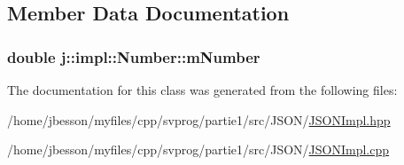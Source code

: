 \subsection{Member Data Documentation}
\hypertarget{classj_1_1impl_1_1_number_a438e3d017fd472aea2d9e3bf2108aac7}{
\subsubsection[{m\-Number}]{\setlength{\rightskip}{0pt plus 5cm}double j\-::impl\-::\-Number\-::m\-Number\hspace{0.3cm}{\ttfamily [private]}}}\label{classj_1_1impl_1_1_number_a438e3d017fd472aea2d9e3bf2108aac7}


The documentation for this class was generated from the following files\-:\begin{DoxyCompactItemize}
\item 
/home/jbesson/myfiles/cpp/svprog/partie1/src/\-J\-S\-O\-N/\hyperlink{_j_s_o_n_impl_8hpp}{J\-S\-O\-N\-Impl.\-hpp}\item 
/home/jbesson/myfiles/cpp/svprog/partie1/src/\-J\-S\-O\-N/\hyperlink{_j_s_o_n_impl_8cpp}{J\-S\-O\-N\-Impl.\-cpp}\end{DoxyCompactItemize}
